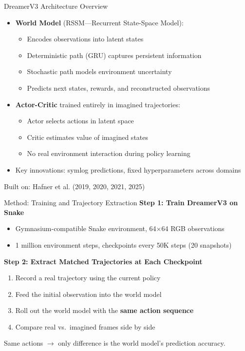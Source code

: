 \documentclass[aspectratio=169]{beamer}
\begin{document}
\begin{frame}{DreamerV3 Architecture Overview}
\begin{itemize}
    \item \textbf{World Model} (RSSM---Recurrent State-Space Model):
    \begin{itemize}
        \item Encodes observations into latent states
        \item Deterministic path (GRU) captures persistent information
        \item Stochastic path models environment uncertainty
        \item Predicts next states, rewards, and reconstructed observations
    \end{itemize}
    \item \textbf{Actor-Critic} trained entirely in imagined trajectories:
    \begin{itemize}
        \item Actor selects actions in latent space
        \item Critic estimates value of imagined states
        \item No real environment interaction during policy learning
    \end{itemize}
    \item Key innovations: symlog predictions, fixed hyperparameters across domains
\end{itemize}

\vspace{0.5em}
\footnotesize{Built on: Hafner et al. (2019, 2020, 2021, 2025)}
\end{frame}

\begin{frame}{Method: Training and Trajectory Extraction}
\textbf{Step 1: Train DreamerV3 on Snake}
\begin{itemize}
    \item Gymnasium-compatible Snake environment, 64$\times$64 RGB observations
    \item 1 million environment steps, checkpoints every 50K steps (20 snapshots)
\end{itemize}

\vspace{0.5em}
\textbf{Step 2: Extract Matched Trajectories at Each Checkpoint}
\begin{enumerate}
    \item Record a real trajectory using the current policy
    \item Feed the initial observation into the world model
    \item Roll out the world model with the \textbf{same action sequence}
    \item Compare real vs.\ imagined frames side by side
\end{enumerate}

\vspace{0.5em}
Same actions $\rightarrow$ only difference is the world model's prediction accuracy.
\end{frame}
\end{document}
